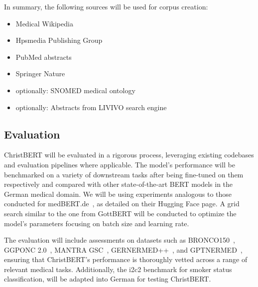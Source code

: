 In summary, the following sources will be used for corpus creation:

\begin{itemize}
    \item Medical Wikipedia
    \item Hpsmedia Publishing Group
    \item PubMed abstracts
    \item Springer Nature
    \item optionally: SNOMED medical ontology
    \item optionally: Abstracts from LIVIVO search engine
\end{itemize}

\subsection*{Evaluation}

ChristBERT will be evaluated in a rigorous process, leveraging existing
codebases and evaluation pipelines where applicable. The model's performance
will be benchmarked on a variety of downstream tasks after being fine-tuned on
them respectively and compared with other state-of-the-art BERT models in the
German medical domain. We will be using experiments analogous to those conducted
for medBERT.de~\cite{bressem2024medbert}, as detailed on their Hugging Face
page. A grid search similar to the one from GottBERT will be conducted to
optimize the model's parameters focusing on batch size and learning rate. 

The evaluation will include assessments on datasets such as
BRONCO150~\cite{kittner2021bronco150}, GGPONC 2.0~\cite{borchert2022ggponc},
MANTRA GSC~\cite{kors2015mantragsc}, GERNERMED++~\cite{frei2022gernermed}, and
GPTNERMED~\cite{frei2023gptnermed}, ensuring that ChristBERT's performance is
thoroughly vetted across a range of relevant medical tasks. Additionally, the
i2c2 benchmark for smoker status classification, will be adapted into German for
testing ChristBERT.
